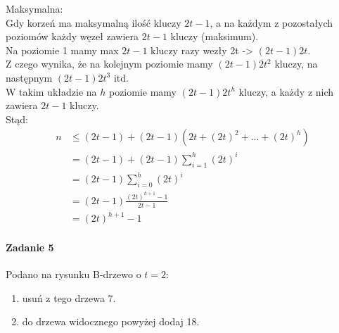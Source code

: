 \documentclass[18pt]{extarticle}
\begin{document}
Maksymalna: \\
Gdy korzeń ma maksymalną ilość kluczy $2t-1$, a na każdym z pozostałych poziomów każdy węzeł zawiera $2t-1$ kluczy (maksimum). \\
Na poziomie 1 mamy max $2t-1$ kluczy razy wezły 2t -> $(2t-1)2t$. \\
Z czego wynika, że na kolejnym poziomie mamy $(2t-1)2t^2$ kluczy, na następnym $(2t-1)2t^3$ itd. \\
W takim układzie na $h$ poziomie mamy $(2t-1)2t^{h}$ kluczy, a każdy z nich zawiera $2t-1$ kluczy. \\
Stąd: \\
\begin{align*}
    n &\leq (2t-1) + (2t-1)(2t + {(2t)}^2 + ... + {(2t)}^{h}) \\
    &= (2t-1) + (2t-1)\sum_{i=1}^{h}{(2t)}^{i} \\
    &= (2t-1)\sum_{i=0}^{h}{(2t)}^{i} \\
    &= (2t-1)\frac{{(2t)}^{h+1}-1}{2t-1} \\
    &= {(2t)}^{h+1}-1
\end{align*}

\paragraph{Zadanie 5} Podano na rysunku B-drzewo o $t=2$:
\begin{center}
        \begin{enumerate}[label=-]
            \item usuń z tego drzewa 7.
            \item do drzewa widocznego powyżej dodaj 18.
        \end{enumerate}
\end{center}
\end{document}
